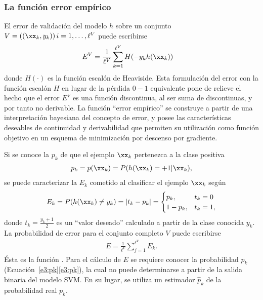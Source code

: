 %
\subsubsection{La función error empírico}
%
El error de validación del modelo $h$ sobre un conjunto
$V=((\xx_k,y_k))\,i=1,\ldots,\ell^V$ puede escribirse
%
\begin{align}
\label{e3:error-test-alt}
  E^V &= \frac{1}{\ell^V}\sum_{k=1}^{\ell^V} H(-{y}_k {h}(\xx_k))
\end{align}
%
donde $H(\cdot)$ es la función escalón de Heaviside. Esta formulación
del error con la función escalón $H$ en lugar de la pérdida $0-1$
equivalente pone de relieve el hecho que el error $E^V$ es una función
discontinua, al ser suma de discontinuas, y por tanto no derivable.
La función ``error empírico'' \cite{ayat} se construye a partir de una
interpretación bayesiana del concepto de error, y posee las
características deseables de continuidad y derivabilidad que permiten
su utilización como función objetivo en un esquema de minimización por
descenso por gradiente.

Si se conoce la  $p_k$ de que el ejemplo
$\xx_k$ pertenezca a la clase positiva
%
\begin{align}
  \label{e3:pk}
  p_k = p(\xx_k) = P(h(\xx_k)=+1|\xx_k),
\end{align}
%
se puede caracterizar la  $E_k$ cometido al
clasificar el ejemplo $\xx_k$ según
%
\begin{align}
\label{e3:Ek}
  E_k = P(h(\xx_k)\neq y_k) = |t_k-{p}_k| =
  \begin{cases}
    {p}_k, & t_k=0\\ 1-{p}_k, & t_k = 1,
  \end{cases}
\end{align}
%
donde $t_k=\frac{y_k+1}{2}$ es un ``valor deseado'' calculado a partir
de la clase conocida $y_k$. La probabilidad de error para el conjunto
completo $V$ puede escribirse
%
\begin{align}
\label{Err1}
  E = \frac{1}{\ell^V}\sum_{j=1}^{\ell^V} E_k.
\end{align}
%
Ésta es la función .
Para el cálculo de $E$ se requiere conocer la probabilidad $p_k$
(\iflatexml{}Ecuación~\ref{e3:pk}\else\autoref{e3:pk}\fi), la cual no
puede determinarse a partir de la salida binaria del modelo SVM.
En su lugar, se utiliza un estimador $\hat{p}_k$ de la probabilidad
real $p_k$.
